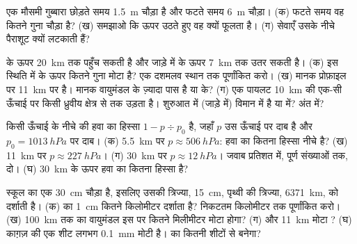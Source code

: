 \begin{exercise}[$\star\star$]\label{exo:g8:the-atmosphere:9}
एक मौसमी गुब्बारा छोड़ते समय \qty{1.5}{m} चौड़ा है और फटते समय \qty{6}{m} चौड़ा।
(क) फटते समय वह कितने गुना चौड़ा है? (ख) समझाओ कि ऊपर उठते हुए वह क्यों फूलता है।
(ग)  सेवाएँ उसके नीचे पैराशूट क्यों लटकाती
हैं?
\end{exercise}

\begin{exercise}[$\star\star$]\label{exo:g8:the-atmosphere:10}
  के ऊपर \qty{20}{km} तक पहुँच सकती है और जाड़े में  के
ऊपर \qty{7}{km} तक उतर सकती है। (क) इस स्थिति में  के ऊपर 
कितने गुना मोटा है? एक दशमलव स्थान तक पूर्णांकित करो। (ख) मानक प्रोफ़ाइल पर
 \qty{11}{km} पर है। मानक वायुमंडल  के ज़्यादा पास है या 
के? (ग) एक पायलट \qty{10}{km} की एक-सी ऊँचाई पर किसी ध्रुवीय क्षेत्र से 
तक उड़ता है। शुरुआत में (जाड़े में) विमान  में है या  में? अंत
में?
\end{exercise}

\begin{exercise}[$\star\star\star$]\label{exo:g8:the-atmosphere:11}
किसी ऊँचाई के नीचे की हवा का हिस्सा $1 - p \div
p_0$ है, जहाँ $p$ उस ऊँचाई पर दाब
है और $p_0 =
\qty{1013}{hPa}$  पर दाब। (क) \qty{5.5}{km} पर
$p
\approx \qty{506}{hPa}$: हवा का कितना हिस्सा नीचे है? (ख) \qty{11}{km} पर
$p \approx \qty{227}{hPa}$। (ग) \qty{30}{km} पर $p \approx
\qty{12}{hPa}$। जवाब
प्रतिशत में, पूर्ण संख्याओं तक, दो। (घ) \qty{30}{km} के ऊपर हवा का कितना हिस्सा है?
\end{exercise}

\begin{exercise}[$\star\star\star$]\label{exo:g8:the-atmosphere:12}
स्कूल का एक  \qty{30}{cm} चौड़ा है, इसलिए उसकी त्रिज्या, \qty{15}{cm}, पृथ्वी
की त्रिज्या, \qty{6371}{km}, को दर्शाती है। (क)  का \qty{1}{cm} कितने
किलोमीटर दर्शाता है? निकटतम किलोमीटर तक पूर्णांकित करो। (ख) \qty{100}{km} तक का
वायुमंडल इस  पर कितने मिलीमीटर मोटा होगा? (ग) और \qty{11}{km} मोटा
? (घ) काग़ज़ की एक शीट लगभग \qty{0.1}{mm} मोटी है।  का 
कितनी शीटों से बनेगा?
\end{exercise}

